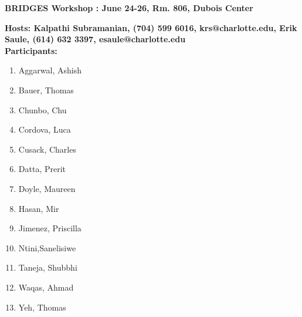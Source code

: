 \documentclass[12pt, onecoulmn]{article}
\begin{document}
\begin{center}
\textbf{\Large BRIDGES Workshop : June 24-26, Rm. 806, Dubois Center}
\end{center}
\textbf{Hosts: Kalpathi Subramanian, (704) 599 6016, krs@charlotte.edu, 
Erik Saule, (614) 632 3397, esaule@charlotte.edu} \\

\textbf{Participants:}
\begin{enumerate}
\item Aggarwal, Ashish
\item Bauer, Thomas
\item Chunbo, Chu
\item Cordova, Luca
\item Cusack, Charles
\item Datta, Prerit
\item Doyle, Maureen
\item Hasan, Mir
\item Jimenez, Priscilla 
\item Ntini,Sanelisiwe
\item Taneja, Shubbhi
\item Waqas, Ahmad
\item Yeh, Thomas
\end{enumerate}
\end{document}
